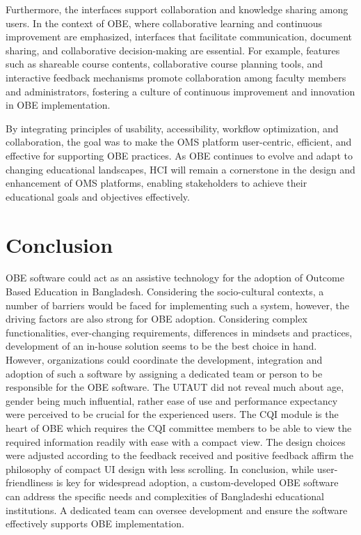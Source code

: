 \documentclass[journal,onecolumn]{IEEEtran}
\begin{document}
\begin{itemize}
Furthermore, the interfaces support collaboration and knowledge sharing among users. In the context of OBE, where collaborative learning and continuous improvement are emphasized, interfaces that facilitate communication, document sharing, and collaborative decision-making are essential. For example, features such as shareable course contents, collaborative course planning tools, and interactive feedback mechanisms promote collaboration among faculty members and administrators, fostering a culture of continuous improvement and innovation in OBE implementation.

By integrating principles of usability, accessibility, workflow optimization, and collaboration, the goal was to make the OMS platform user-centric, efficient, and effective for supporting OBE practices. As OBE continues to evolve and adapt to changing educational landscapes, HCI will remain a cornerstone in the design and enhancement of OMS platforms, enabling stakeholders to achieve their educational goals and objectives effectively. 
\end{itemize}
\section{\textbf{Conclusion}}
OBE software could act as an assistive technology for the adoption of Outcome Based Education in Bangladesh. Considering the socio-cultural contexts, a number of barriers would be faced for implementing such a system, however, the driving factors are also strong for OBE adoption. Considering complex functionalities, ever-changing requirements, differences in mindsets and practices, development of an in-house solution seems to be the best choice in hand. However, organizations could coordinate the development, integration and adoption of such a software by assigning a dedicated team or person to be responsible for the OBE software. The UTAUT did not reveal much about age, gender being much influential, rather ease of use and performance expectancy were perceived to be crucial for the experienced users. The CQI module is the heart of OBE which requires the CQI committee members to be able to view the required information readily with ease with a compact view. The design choices were adjusted according to the feedback received and positive feedback affirm the philosophy of compact UI design with less scrolling. In conclusion, while user-friendliness is key for widespread adoption, a custom-developed OBE software can address the specific needs and complexities of Bangladeshi educational institutions.  A dedicated team can oversee development and ensure the software effectively supports OBE implementation.
\end{document}
